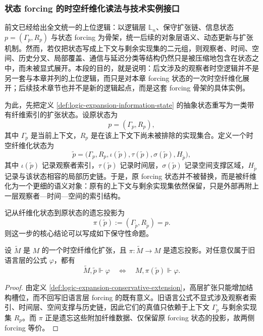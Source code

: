 \subsubsection{状态 forcing 的时空纤维化读法与技术实例接口}\label{subsubsec:logic-expansion-chain-spacetime-fiberization-interface}

前文已经给出全文统一的上位逻辑：以逻辑层 \(\mathbb L_n\)、保守扩张链、信息状态 \(p=(\Gamma_p,R_p)\) 与状态 forcing 为骨架，统一后续的对象层语义、动态更新与扩张机制。然而，若仅把状态写成上下文与剩余实现集的二元组，则观察者、时间、空间、历史分叉、局部覆盖、通信与延迟分类等结构仍然只是被压缩地包含在状态之中，而未被显式展开。本段的目的，就是说明：后文涉及的观察者时空逻辑并不是另一套与本章并列的上位逻辑，而只是对本章 forcing 状态的一次时空纤维化展开；后续技术章节也并不是新的逻辑起点，而是这套 forcing 骨架的具体实例。

为此，先把定义 \ref{def:logic-expansion-information-state} 的抽象状态重写为一类带有纤维索引的扩张状态。设原状态为
\[
p=(\Gamma_p,R_p),
\]
其中 \(\Gamma_p\) 是当前上下文，\(R_p\) 是在该上下文下尚未被排除的实现集合。定义一个时空纤维化状态为
\[
\widetilde p=
\bigl(
\Gamma_p,
R_p,
\iota(\widetilde p),
\tau(\widetilde p),
\sigma(\widetilde p),
H_{\widetilde p}
\bigr),
\]
其中 \(\iota(\widetilde p)\) 记录观察者索引，\(\tau(\widetilde p)\) 记录时间层，\(\sigma(\widetilde p)\) 记录空间支撑区域，\(H_{\widetilde p}\) 记录与该状态相容的局部历史链。于是，原 forcing 状态并不被替换，而是被纤维化为一个更细的语义对象：原有的上下文与剩余实现集依然保留，只是外部再附上一层观察者—时间—空间的索引结构。

记从纤维化状态到原状态的遗忘投影为
\[
\pi(\widetilde p):=(\Gamma_{\widetilde p},R_{\widetilde p})=p.
\]
则这一步的核心结论可以写成如下保守性命题。

\begin{proposition}[时空纤维化的保守性]\label{prop:logic-expansion-spacetime-fiberization-conservative}
设 \(\widetilde M\) 是 \(M\) 的一个时空纤维化扩张，且 \(\pi:\widetilde M\to M\) 是遗忘投影。对任意仅属于旧语言层的公式 \(\varphi\)，都有
\[
\widetilde M,\widetilde p \Vdash \varphi
\quad\Longleftrightarrow\quad
M,\pi(\widetilde p)\Vdash \varphi.
\]
\end{proposition}

\begin{proof}
由定义 \ref{def:logic-expansion-conservative-extension}，高层扩张只能增加结构槽位，而不回写旧语言层 forcing 的既有意义。旧语言公式不显式涉及观察者索引、时间层、空间支撑与历史链，因此它们的真值只依赖于上下文 \(\Gamma_p\) 与剩余实现集 \(R_p\)。而 \(\pi\) 正是遗忘这些附加纤维数据、仅保留原 forcing 状态的投影，故两侧 forcing 等价。
\end{proof}

